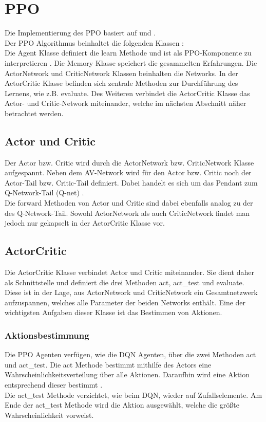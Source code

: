 \section{PPO} \label{sec:Implementierung_PPO}
Die Implementierung des PPO basiert auf \cite{pytorch_minimal_ppo} und \cite{Charles2013}.\\
Der PPO Algorithmus beinhaltet die folgenden Klassen :\\
Die Agent Klasse definiert die learn Methode und ist als PPO-Komponente zu interpretieren .
Die Memory Klasse speichert die gesammelten Erfahrungen.
Die ActorNetwork und CriticNetwork Klassen beinhalten die Networks.
In der ActorCritic Klasse befinden sich zentrale Methoden zur Durchführung des Lernens, wie z.B. evaluate. 
Des Weiteren verbindet die ActorCritic Klasse das Actor- und Critic-Network miteinander, welche im nächsten Abschnitt näher betrachtet werden.

\subsection{Actor und Critic} \label{subsec:Implementierung_Actor_und_Critic}
Der Actor bzw. Critic wird durch die ActorNetwork bzw. CriticNetwork Klasse aufgespannt.
Neben dem AV-Network wird für den Actor bzw. Critic noch der Actor-Tail bzw. Critic-Tail definiert. Dabei handelt es sich um das Pendant zum Q-Network-Tail (Q-net) .\\
Die forward Methoden von Actor und Critic sind dabei ebenfalls analog zu der des Q-Network-Tail. 
Sowohl ActorNetwork als auch CriticNetwork findet man jedoch nur gekapselt in der ActorCritic Klasse vor.

\subsection{ActorCritic} \label{subsec:Implementierung_ActorCritic}
Die ActorCritic Klasse verbindet Actor und Critic miteinander. Sie dient daher als Schnittstelle und definiert die drei Methoden act, act\_test und evaluate.\\
Diese ist in der Lage, aus ActorNetwork und CriticNetwork ein Gesamtnetzwerk aufzuspannen, welches alle Parameter der beiden Networks enthält. Eine der wichtigsten Aufgaben dieser Klasse ist das Bestimmen von Aktionen.

\subsubsection{Aktionsbestimmung} \label{subsubsec:Implementierung_Aktionsbestimmung_PPO}
Die PPO Agenten verfügen, wie die DQN Agenten, über die zwei Methoden act und act\_test. Die act Methode bestimmt mithilfe des Actors eine Wahrscheinlichkeitsverteilung über alle Aktionen.
Daraufhin wird eine Aktion entsprechend dieser bestimmt .\\
Die act\_test Methode verzichtet, wie beim DQN, wieder auf Zufallselemente.
Am Ende der act\_test Methode wird die Aktion ausgewählt, welche die größte Wahrscheinlichkeit vorweist.

